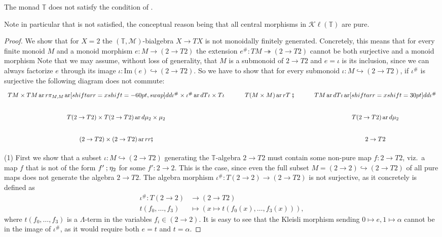 \documentclass[a4paper, UKenglish, numberwithinsect, thm-restate, cleveref, final]{lipics-v2021}
\theoremstyle{plain}
\theoremstyle{definition}
\newcommand{\T}{\ensuremath{\mathbb{T}}\xspace}
\newcommand{\seq}{\ensuremath{\mathbin{\text{\upshape;}}}}
\newcommand{\M}{\ensuremath{\mathcal{M}}\xspace}
\newcommand{\Kl}{\ensuremath{\mathcal{K}\!\ell}}
\newcommand{\kseq}{\ensuremath{\mathrel{\fatsemi}}}
\DeclareMathOperator{\ar}{ar}
\newcommand{\incl}{\hookrightarrow}
\newcommand{\epi}{\twoheadrightarrow}
\numberwithin{equation}{section}
\begin{document}
\begin{lemma}
  The monad \T{} does not satisfy the condition of .
\end{lemma}
Note in particular that  is not satisfied, the conceptual reason being that all central morphisms in $\Kl(\T)$ are pure.
\begin{proof}
  We show that for $X = 2$ the $(\T,\M)$-bialgebra $X \to T X$ is not monoidally finitely generated.
  Concretely, this means that for every finite monoid $M$ and a monoid morphism $e \colon M \rightarrow (2\to T 2)$ the extension $e^{\#} \colon TM \epi (2 \to T 2)$ cannot be both surjective and a monoid morphism
  Note that we may assume, without loss of generality, that $M$ is a submonoid of $2 \to T2$ and $e = \iota$ is its inclusion, since we can always factorize $e$ through its image $\iota \colon \mathrm{Im}(e) \hookrightarrow (2 \to T2)$.
  So we have to show that for every submonoid $\iota \colon M \incl (2 \rightarrow T 2)$, if $\iota^{\#}$ is surjective the following diagram does not commute:
  \begin{equation}
    \label{eq:mor-diag}
    \begin{tikzcd}
      TM \times TM \ar{r}{\pi_{M, M}} \ar[shiftarr={xshift=-60pt}, swap]{dd}{\iota^{\#} \times \iota^{\#}} \ar{d}{T \iota \times T \iota} & T(M \times M) \ar{r}{T \kseq} & TM \ar{d}{T \iota} \ar[shiftarr={xshift=30pt}]{dd}{\iota^{\#}} \\
      T(2 \to T 2) \times T(2 \to T 2) \ar{d}{\mu_{2} \times \mu_{2}} & & T(2 \to T2) \ar{d}{\mu_{2}} \\
      (2 \to T2) \times (2 \to T2) \ar{rr}{\kseq} && 2 \to T2
    \end{tikzcd}
  \end{equation}


  \medskip\noindent(1) First we show that a subset $\iota \colon M \incl (2 \rightarrow T 2)$ generating the \T-algebra $2 \rightarrow T 2$ must contain some non-pure map $f \colon 2 \to T 2$, viz.\ a map $f$ that is not of the form $f' \seq \eta_{2}$ for some $f' \colon 2 \rightarrow 2$. This is the case, since even the full subset $M = (2 \rightarrow 2) \incl (2 \rightarrow T2)$ of all pure maps does not generate the algebra $2 \to T 2$. The algebra morphism $\iota^{\#} \colon T(2 \rightarrow 2) \rightarrow (2 \rightarrow T 2)$ is not surjective, as it concretely is defined as
  \begin{align*}
    \iota^{\#} \colon T(2 \rightarrow 2) &\rightarrow (2 \rightarrow T 2) \\
    t(f_{0}, \ldots, f_{3}) &\mapsto (x \mapsto t(f_{0}(x), \ldots, f_{3}(x))),
  \end{align*}
  where $t(f_{0}, \ldots , f_{3})$ is a $\Lambda$-term in the variables $f_{i} \in (2 \rightarrow 2)$.
  It is easy to see that the Kleisli morphism sending $0 \mapsto e, 1 \mapsto \alpha$ cannot be in the image of $\iota^{\#}$, as it would require both $e = t $ and $t =  \alpha$.



\end{proof}
\end{document}

